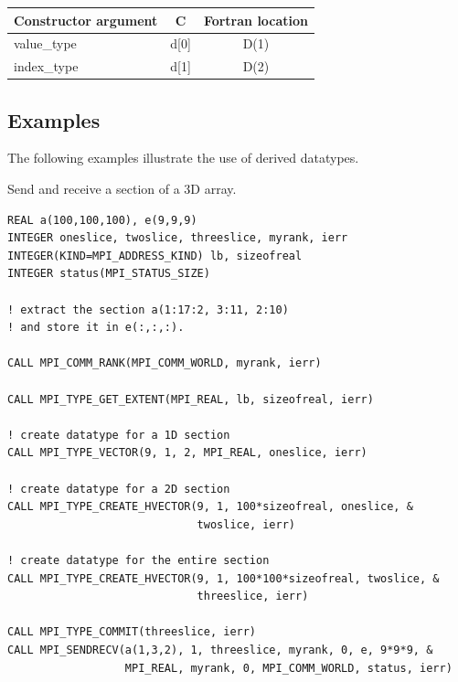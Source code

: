 \begin{description}[style=unboxed,leftmargin=0cm]
\smallskip%
\begin{center}
\begin{tabular}{l c c}
\hline
Constructor argument &          C &                    Fortran location                \\
\hline
value\_type &                   d[0] &                          D(1)                            \\
index\_type &                   d[1] &                          D(2)                            \\
\hline
\end{tabular}
\end{center}

\end{description}

\subsection{Examples}
\label{subsec:pt2pt-examples}

The following examples illustrate the use of derived datatypes.

\begin{example}
\label{pt2pt-exCC}
%
%
Send and receive a section of a 3D array.

\begin{lstlisting}[language={[MPI]Fortran}]
REAL a(100,100,100), e(9,9,9)
INTEGER oneslice, twoslice, threeslice, myrank, ierr
INTEGER(KIND=MPI_ADDRESS_KIND) lb, sizeofreal
INTEGER status(MPI_STATUS_SIZE)

! extract the section a(1:17:2, 3:11, 2:10)
! and store it in e(:,:,:).

CALL MPI_COMM_RANK(MPI_COMM_WORLD, myrank, ierr)

CALL MPI_TYPE_GET_EXTENT(MPI_REAL, lb, sizeofreal, ierr)

! create datatype for a 1D section
CALL MPI_TYPE_VECTOR(9, 1, 2, MPI_REAL, oneslice, ierr)

! create datatype for a 2D section
CALL MPI_TYPE_CREATE_HVECTOR(9, 1, 100*sizeofreal, oneslice, &
                             twoslice, ierr)

! create datatype for the entire section
CALL MPI_TYPE_CREATE_HVECTOR(9, 1, 100*100*sizeofreal, twoslice, &
                             threeslice, ierr)

CALL MPI_TYPE_COMMIT(threeslice, ierr)
CALL MPI_SENDRECV(a(1,3,2), 1, threeslice, myrank, 0, e, 9*9*9, &
                  MPI_REAL, myrank, 0, MPI_COMM_WORLD, status, ierr)
\end{lstlisting}
\end{example}


